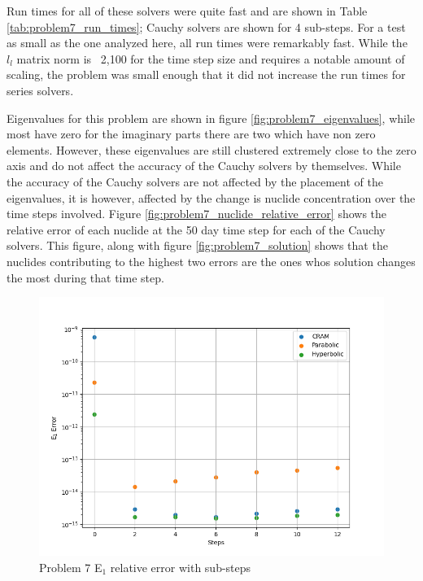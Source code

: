 Run times for all of these solvers were quite fast and are shown in Table \ref{tab:problem7_run_times}; Cauchy solvers are shown for 4 sub-steps. For a test as small as the one analyzed here, all run times were remarkably fast. While the $l_{l}$ matrix norm is ~2,100 for the time step size and requires a notable amount of scaling, the problem was small enough that it did not increase the run times for series solvers. 

Eigenvalues for this problem are shown in figure \ref{fig:problem7_eigenvalues}, while most have zero for the imaginary parts there are two which have non zero elements. However, these eigenvalues are still clustered extremely close to the zero axis and do not affect the accuracy of the Cauchy solvers by themselves. While the accuracy of the Cauchy solvers are not affected by the placement of the eigenvalues, it is however, affected by the change is nuclide concentration over the time steps involved. Figure \ref{fig:problem7_nuclide_relative_error} shows the relative error of each nuclide at the 50 day time step for each of the Cauchy solvers. This figure, along with figure \ref{fig:problem7_solution} shows that the nuclides contributing to the highest two errors are the ones whos solution changes the most during that time step. 

\clearpage

\begin{figure}[p]
    \centering
    \includegraphics[width=6in]{images/chapter-5/progressionProblems/problem7/problem7E1ErrorWithSteps.png}
    \caption{Problem 7 E${}_{1}$ relative error with sub-steps}
    \label{fig:problem7_E1_error_with_steps}
\end{figure}

